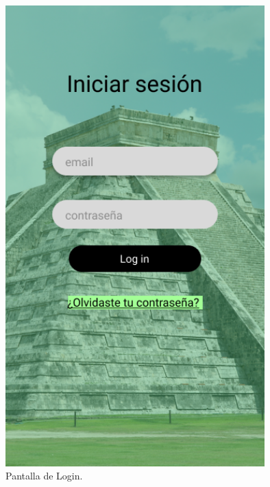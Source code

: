\begin{figure}[htb]
    \centering
    \includegraphics[width=10cm]{pantalla0.png}
    \caption{Pantalla de Login.}
    \label{fig:enter-label}
\end{figure}

